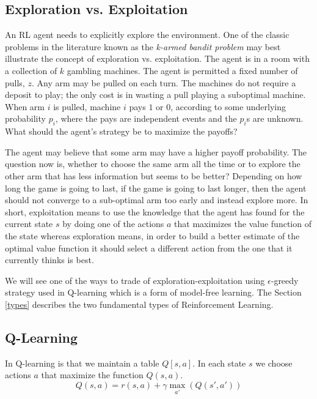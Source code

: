 \documentclass[12pt]{report}
\begin{document}
\subsection{Exploration vs. Exploitation}
An RL agent needs to explicitly explore the environment. One of the classic problems in the literature known as the \textit{k-armed bandit problem} \cite{berry1985bandit} may best illustrate the concept of exploration vs. exploitation. The agent is in a room with a collection of
$k$ gambling machines. The agent is permitted a fixed number of pulls, $z$. Any arm may be pulled on each turn. The machines do not require a deposit to play; the only cost is in wasting a pull playing a suboptimal machine. When arm $i$ is pulled, machine $i$ pays $1$ or $0$, according to some underlying
probability $p_i$, where the pays are independent events and the $p_i$s are unknown.
What should the agent's strategy be to maximize the payoffs?\par 
The agent may believe that some arm may have a higher payoff probability. The question now is, whether to choose the same arm all the time or to explore the other arm that has less information but seems to be better? Depending on how long the game is going to last, if the game is going to last longer, then the agent should not converge to a sub-optimal arm too early and instead explore more. In short, 
exploitation means to use the knowledge that the agent has found for the current state $s$ by doing one of the actions $a$ that maximizes the value function of the state whereas exploration means, in order to build a better estimate of the optimal value function it should select a different action from the one that it currently thinks is best.\par 
We will see one of the ways to trade of exploration-exploitation using $\epsilon$-greedy strategy used in Q-learning which is a form of model-free learning. The Section \ref{types} describes the two fundamental types of Reinforcement Learning.


\subsection{Q-Learning}
\label{q_learning_section}
In Q-learning is that we maintain a table $Q[s,a]$. In each state $s$ we choose actions $a$ that maximize the function $Q(s,a)$. 
\begin{equation} \label{q_function}
Q(s,a) = r(s,a) + \gamma \max_{a'}(Q(s',a'))
\end{equation}
\end{document}
